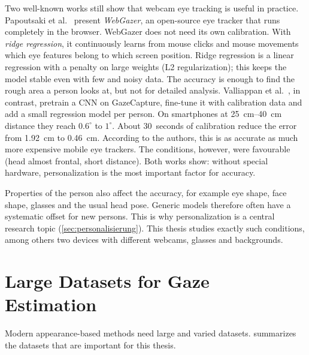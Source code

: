 Two well-known works still show that webcam eye tracking is useful in practice.
Papoutsaki et al.~\cite{papoutsaki2016webgazer} present \emph{WebGazer}, an
open-source eye tracker that runs completely in the browser. WebGazer does not
need its own calibration. With \emph{ridge regression}, it continuously learns from
mouse clicks and mouse movements which eye features belong to which screen
position. Ridge regression is a linear regression with a penalty on large
weights (L2 regularization); this keeps the model stable even with few and
noisy data. The accuracy is enough to find the rough area a person looks at, but
not for detailed analysis. Valliappan et al.~\cite{valliappan2020smartphone},
in contrast, pretrain a CNN on GazeCapture, fine-tune it with calibration data
and add a small regression model per person. On smartphones at
\SIrange{25}{40}{\centi\metre} distance they reach $0.6^\circ$ to $1^\circ$.
About 30~seconds of calibration reduce the error from \SI{1.92}{\centi\metre}
to \SI{0.46}{\centi\metre}. According to the authors, this is as accurate as
much more expensive mobile eye trackers. The conditions, however, were
favourable (head almost frontal, short distance). Both works show: without
special hardware, personalization is the most important factor for accuracy.

Properties of the person also affect the accuracy, for example eye shape, face
shape, glasses and the usual head pose. Generic models therefore often have a
systematic offset for new persons. This is why personalization is a central
research topic (\cref{sec:personalisierung}). This thesis studies exactly such
conditions, among others two devices with different webcams,
glasses and backgrounds.

\section{Large Datasets for Gaze Estimation}
\label{sec:datensaetze}
Modern appearance-based methods need large and varied datasets.
 summarizes the datasets that are important for this
thesis.

